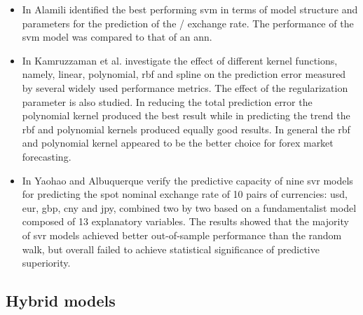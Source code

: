 \begin{itemize}
    \item In \cite{svm-2} Alamili identified the best performing \gls{svm} in terms of model structure and parameters for the prediction of the / exchange rate. The performance of the \gls{svm} model was compared to that of an \gls{ann}.
    \item In \cite{svm-1} Kamruzzaman et al. investigate the effect of different kernel functions, namely, linear, polynomial, \gls{rbf} and spline on the prediction error measured by several widely used performance metrics. The effect of the regularization parameter is also studied. In reducing the total prediction error the polynomial kernel produced the best result while in predicting the trend the \gls{rbf} and polynomial kernels produced equally good results. In general the \gls{rbf} and polynomial kernel appeared to be the better choice for \gls{forex} market forecasting.
    \item In \cite{svr} Yaohao and Albuquerque verify the predictive capacity of nine \gls{svr} models for predicting the spot nominal exchange rate of 10 pairs of currencies: \gls{usd}, \gls{eur}, \gls{gbp}, \gls{cny} and \gls{jpy}, combined two by two based on a fundamentalist model composed of 13 explanatory variables. The results showed that the majority of \gls{svr} models achieved better out-of-sample performance than the random walk, but overall failed to achieve statistical significance of predictive superiority.
\end{itemize}

\subsection{Hybrid models}\label{Hybrid models}

